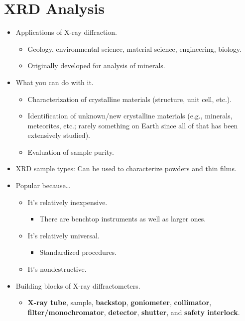 \documentclass[../notes.tex]{subfiles}
\begin{document}
\section{XRD Analysis}
\begin{itemize}
    \item {}Applications of X-ray diffraction.
    \begin{itemize}
        \item Geology, environmental science, material science, engineering, biology.
        \item Originally developed for analysis of minerals.
    \end{itemize}
    \item What you can do with it.
    \begin{itemize}
        \item Characterization of crystalline materials (structure, unit cell, etc.).
        \item Identification of unknown/new crystalline materials (e.g., minerals, meteorites, etc.; rarely something on Earth since all of that has been extensively studied).
        \item Evaluation of sample purity.
    \end{itemize}
    \item XRD sample types: Can be used to characterize powders and thin films.
    \item Popular because\dots
    \begin{itemize}
        \item It's relatively inexpensive.
        \begin{itemize}
            \item There are benchtop instruments as well as larger ones.
        \end{itemize}
        \item It's relatively universal.
        \begin{itemize}
            \item Standardized procedures.
        \end{itemize}
        \item It's nondestructive.
    \end{itemize}
    \item Building blocks of X-ray diffractometers.
    \begin{itemize}
        \item \textbf{X-ray tube}, sample, \textbf{backstop}, \textbf{goniometer}, \textbf{collimator}, \textbf{filter/monochromator}, \textbf{detector}, \textbf{shutter}, and \textbf{safety interlock}.

\end{itemize}
\end{itemize}
\end{document}
